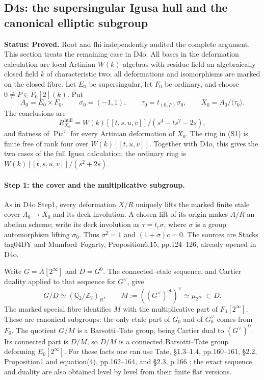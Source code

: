 \subsection*{D4s: the supersingular Igusa hull and the canonical elliptic subgroup}
\textbf{Status: Proved.} Root and fhi independently audited the complete argument.
This section treats the remaining case in D4o. All bases in the
deformation calculation are local Artinian $W(k)$-algebras with residue
field an algebraically closed field $k$ of characteristic two; all
deformations and isomorphisms are marked on the closed fibre. Let
$E_0$ be supersingular, let $F_0$ be ordinary, and choose
$0\ne P\in F_0[2](k)$. Put
\[
 A_0=E_0\times F_0,\qquad \sigma_0=(-1,1),\qquad
 \tau_0=t_{(0,P)}\sigma_0,\qquad X_0=A_0/\langle\tau_0\rangle.
\]
The conclusions are
\[
 R_{X_0}^{\mathrm{hull}}
   =W(k)[[t,s,u,v]]/(s^4-ts^2-2s),                       \tag{S1}
\]
and flatness of $\operatorname{Pic}^{\tau}$ for every Artinian
deformation of $X_0$. The ring in (S1) is finite free of rank four over
$W(k)[[t,u,v]]$. Together with D4o, this gives the two cases of the full
Igusa calculation; the ordinary ring is
$W(k)[[t,s,u,v]]/(s^2+2s)$.

\paragraph{Step 1: the cover and the multiplicative subgroup.}
As in D4o Step1, every deformation $X/R$ uniquely lifts the marked
finite etale cover $A_0\to X_0$ and its deck involution. A chosen lift
of its origin makes $A/R$ an abelian scheme; write its deck involution
as $\tau=t_c\sigma$, where $\sigma$ is a group automorphism lifting
$\sigma_0$. Thus $\sigma^2=1$ and $(1+\sigma)c=0$.
The sources are Stacks tag04DY and Mumford--Fogarty,
Proposition6.15, pp.124--126, already opened in D4o.

Write $G=A[2^\infty]$ and $D=G^0$. The connected--etale sequence,
and Cartier duality applied to that sequence for $G^\vee$, give
\[
 G/D\simeq (\mathbb Q_2/\mathbb Z_2)_R,
 \qquad M:=((G^\vee)^{\mathrm{et}})^\vee
       \simeq\mu_{2^\infty}\ \subset D.                 \tag{S2}
\]
The marked special fibre identifies $M$ with the multiplicative
part of $F_0[2^\infty]$. These are canonical subgroups: the only
etale part of $G_0$ and of $G_0^\vee$ comes from $F_0$.
The quotient $G/M$ is a Barsotti--Tate group, being Cartier dual to
$(G^\vee)^0$. Its connected part is $D/M$, so $D/M$ is a connected
Barsotti--Tate group deforming $E_0[2^\infty]$.
For these facts one can use Tate, \S1.3--1.4, pp.160--161,
\S2.2, Proposition1 and equation(4), pp.162--164, and
\S2.3, p.166 \cite{DGJ_Tate1967}; the exact sequence and duality
are also obtained level by level from their finite flat versions.

